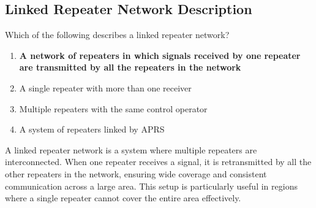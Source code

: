\subsection{Linked Repeater Network Description}
\label{T2B03}

\begin{tcolorbox}[colback=gray!10!white,colframe=black!75!black,title=T2B03]
Which of the following describes a linked repeater network?
\begin{enumerate}[noitemsep]
    \item \textbf{A network of repeaters in which signals received by one repeater are transmitted by all the repeaters in the network}
    \item A single repeater with more than one receiver
    \item Multiple repeaters with the same control operator
    \item A system of repeaters linked by APRS
\end{enumerate}
\end{tcolorbox}

A linked repeater network is a system where multiple repeaters are interconnected. When one repeater receives a signal, it is retransmitted by all the other repeaters in the network, ensuring wide coverage and consistent communication across a large area. This setup is particularly useful in regions where a single repeater cannot cover the entire area effectively.